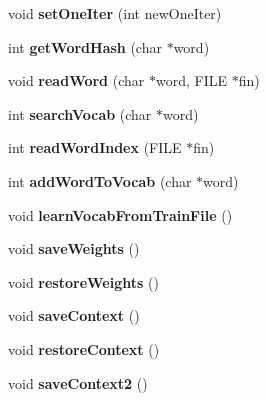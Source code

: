 \begin{DoxyCompactItemize}
void {\bfseries set\+One\+Iter} (int new\+One\+Iter)
\item 
\mbox{\label{class_c_rnn_l_m_ae6da6a326e43726520638249042708c6}} 
int {\bfseries get\+Word\+Hash} (char $\ast$word)
\item 
\mbox{\label{class_c_rnn_l_m_aad8a8cc16db1c424b35a4332b8876b53}} 
void {\bfseries read\+Word} (char $\ast$word, F\+I\+LE $\ast$fin)
\item 
\mbox{\label{class_c_rnn_l_m_a4e020c1ac890b617c5c209b88ca35097}} 
int {\bfseries search\+Vocab} (char $\ast$word)
\item 
\mbox{\label{class_c_rnn_l_m_ac0a30a1a7f8afa4f66ff2255863d0e87}} 
int {\bfseries read\+Word\+Index} (F\+I\+LE $\ast$fin)
\item 
\mbox{\label{class_c_rnn_l_m_a8ae84e317f16a2509deabf6287666f56}} 
int {\bfseries add\+Word\+To\+Vocab} (char $\ast$word)
\item 
\mbox{\label{class_c_rnn_l_m_a26ee6d7beba08f0ea3dd3f27c0025c44}} 
void {\bfseries learn\+Vocab\+From\+Train\+File} ()
\item 
\mbox{\label{class_c_rnn_l_m_aeccb688089da8a71d82c412f3f454840}} 
void {\bfseries save\+Weights} ()
\item 
\mbox{\label{class_c_rnn_l_m_a6a2a247ad2651487ed0e811ad1211516}} 
void {\bfseries restore\+Weights} ()
\item 
\mbox{\label{class_c_rnn_l_m_a86ad944c56163f32905610caa16dedb4}} 
void {\bfseries save\+Context} ()
\item 
\mbox{\label{class_c_rnn_l_m_aaeedc59a9cda172e559256951aae2ae8}} 
void {\bfseries restore\+Context} ()
\item 
\mbox{\label{class_c_rnn_l_m_aefcd658463f107d096062cba1c70f6e8}} 
void {\bfseries save\+Context2} ()
\item 
\mbox{\label{class_c_rnn_l_m_a8a24bfc22d014a36a2e6f2dfdcf9b141}} 

\end{DoxyCompactItemize}
